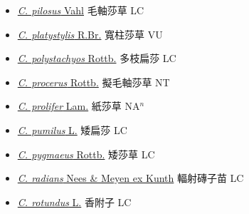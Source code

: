 \begin{itemize}
\begin{itemize}
        \item[] \href{http://www.theplantlist.org/tpl1.1/search?q=Cyperus+pilosus}{\textit{C. pilosus} Vahl}   毛軸莎草 LC
        \item[] \href{http://www.theplantlist.org/tpl1.1/search?q=Cyperus+platystylis}{\textit{C. platystylis} R.Br.}   寬柱莎草 VU
        \item[] \href{http://www.theplantlist.org/tpl1.1/search?q=Cyperus+polystachyos}{\textit{C. polystachyos} Rottb.}     多枝扁莎 LC
        \item[] \href{http://www.theplantlist.org/tpl1.1/search?q=Cyperus+procerus}{\textit{C. procerus} Rottb.}   擬毛軸莎草 NT
        \item[] \href{http://www.theplantlist.org/tpl1.1/search?q=Cyperus+prolifer}{\textit{C. prolifer} Lam.}   紙莎草 NA$^n$
        \item[] \href{http://www.theplantlist.org/tpl1.1/search?q=Cyperus+pumilus}{\textit{C. pumilus} L.}     矮扁莎 LC
        \item[] \href{http://www.theplantlist.org/tpl1.1/search?q=Cyperus+pygmaeus}{\textit{C. pygmaeus} Rottb.}   矮莎草 LC
        \item[] \href{http://www.theplantlist.org/tpl1.1/search?q=Cyperus+radians}{\textit{C. radians} Nees \& Meyen ex Kunth}     輻射磚子苗 LC
        \item[] \href{http://www.theplantlist.org/tpl1.1/search?q=Cyperus+rotundus}{\textit{C. rotundus} L.}   香附子 LC

\end{itemize}
\end{itemize}
